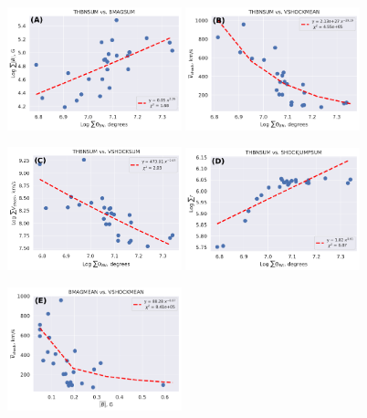 \begin{figure}[!htp] %
	\centerline{
		\includegraphics[width=0.45\textwidth]{chapter2/figs/THBNSUM_BMAGSUM.pdf}
		\includegraphics[width=0.45\textwidth]{chapter2/figs/THBNSUM_VSHOCKMEAN.pdf}
	}
	\centerline{
		\includegraphics[width=0.45\textwidth]{chapter2/figs/THBNSUM_VSHOCKSUM.pdf}
		\includegraphics[width=0.45\textwidth]{chapter2/figs/THBNSUM_SHOCKJUMPSUM.pdf}
	}
	\centerline{
		\includegraphics[width=0.45\textwidth]{chapter2/figs/BMAGMEAN_VSHOCKMEAN.pdf}
}
\end{figure}
